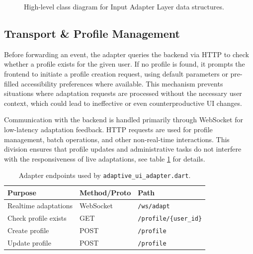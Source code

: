 \begin{figure}[H]
\caption{High-level class diagram for Input Adapter Layer data structures.}
\label{fig:adapter-classes}
\end{figure}

\subsection{Transport \& Profile Management}
Before forwarding an event, the adapter queries the backend via HTTP to check whether a profile exists for the given user. If no profile is found, it prompts the frontend to initiate a profile creation request, using default parameters or pre-filled accessibility preferences where available. This mechanism prevents situations where adaptation requests are processed without the necessary user context, which could lead to ineffective or even counterproductive UI changes.

Communication with the backend is handled primarily through WebSocket for low-latency adaptation feedback. HTTP requests are used for profile management, batch operations, and other non-real-time interactions. This division ensures that profile updates and administrative tasks do not interfere with the responsiveness of live adaptations, see table \ref{tab:adapter_endpoints} for details.

\begin{table}[H]
\centering
\caption{Adapter endpoints used by \texttt{adaptive\_ui\_adapter.dart}.}
\begin{tabular}{lll}
\toprule
Purpose & Method/Proto & Path \\
\midrule
Realtime adaptations & WebSocket & \verb|/ws/adapt| \\
Check profile exists & GET & \verb|/profile/{user_id}| \\
Create profile       & POST & \verb|/profile| \\
Update profile       & POST  & \verb|/profile| \\
\bottomrule
\end{tabular}
\label{tab:adapter_endpoints}
\end{table}

